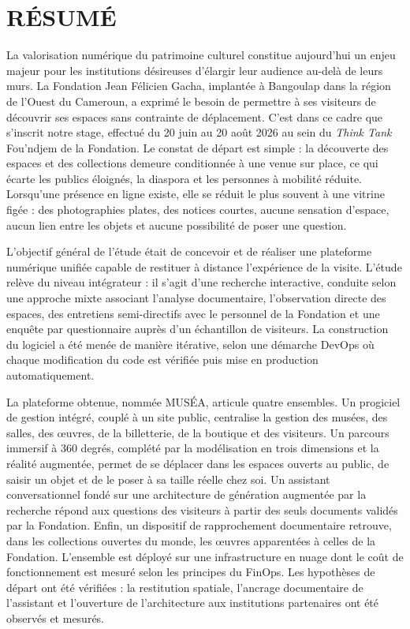 \cleardoublepage
{}
\chapter*{RÉSUMÉ}

\begingroup
{}

La valorisation numérique du patrimoine culturel constitue aujourd'hui un enjeu
majeur pour les institutions désireuses d'élargir leur audience au-delà de leurs
murs. La Fondation Jean Félicien Gacha, implantée à Bangoulap dans la région de
l'Ouest du Cameroun, a exprimé le besoin de permettre à ses visiteurs de
découvrir ses espaces sans contrainte de déplacement. C'est dans ce cadre que
s'inscrit notre stage, effectué du 20 juin au 20 août 2026 au sein du
\emph{Think Tank} Fou'ndjem de la Fondation. Le constat de départ est simple : la
découverte des espaces et des collections demeure conditionnée à une venue sur
place, ce qui écarte les publics éloignés, la diaspora et les personnes à
mobilité réduite. Lorsqu'une présence en ligne existe, elle se réduit le plus
souvent à une vitrine figée : des photographies plates, des notices courtes,
aucune sensation d'espace, aucun lien entre les objets et aucune possibilité de
poser une question.

L'objectif général de l'étude était de concevoir et de réaliser une plateforme
numérique unifiée capable de restituer à distance l'expérience de la visite.
L'étude relève du niveau intégrateur : il s'agit d'une recherche interactive,
conduite selon une approche mixte associant l'analyse documentaire,
l'observation directe des espaces, des entretiens semi-directifs avec le
personnel de la Fondation et une enquête par questionnaire auprès d'un
échantillon de visiteurs. La construction du logiciel a été menée de manière
itérative, selon une démarche DevOps où chaque modification du code est vérifiée
puis mise en production automatiquement.

La plateforme obtenue, nommée MUSÉA, articule quatre ensembles. Un progiciel de
gestion intégré, couplé à un site public, centralise la gestion des musées, des
salles, des œuvres, de la billetterie, de la boutique et des visiteurs. Un
parcours immersif à 360 degrés, complété par la modélisation en trois dimensions
et la réalité augmentée, permet de se déplacer dans les espaces ouverts au
public, de saisir un objet et de le poser à sa taille réelle chez soi. Un
assistant conversationnel fondé sur une architecture de génération augmentée par
la recherche répond aux questions des visiteurs à partir des seuls documents
validés par la Fondation. Enfin, un dispositif de rapprochement documentaire
retrouve, dans les collections ouvertes du monde, les œuvres apparentées à
celles de la Fondation. L'ensemble est déployé sur une infrastructure en nuage
dont le coût de fonctionnement est mesuré selon les principes du FinOps. Les
hypothèses de départ ont été vérifiées : la restitution spatiale, l'ancrage
documentaire de l'assistant et l'ouverture de l'architecture aux institutions
partenaires ont été observés et mesurés.

